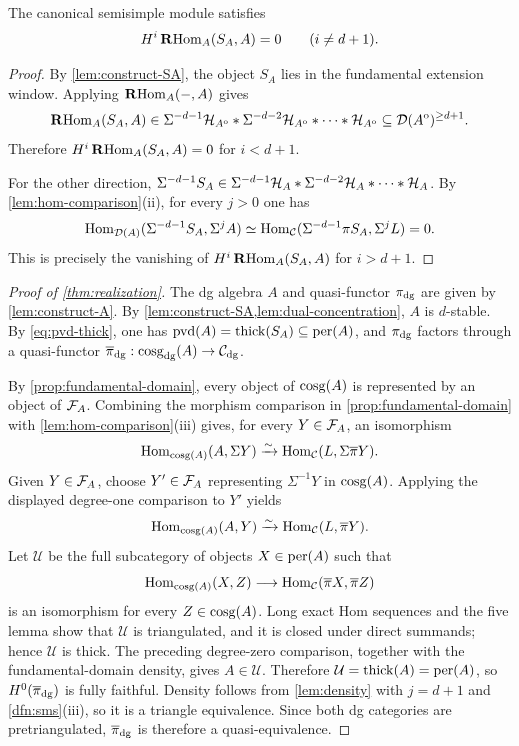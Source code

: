 \documentclass[11pt,a4paper,dvipsnames,x11names]{amsart}
\begin{document}
\begin{lem}\label{lem:dual-concentration}
    The canonical semisimple module satisfies
    \[
    H^i\operatorname{\mathbf{R}Hom}_A(S_A,A)=0\qquad(i\neq d+1).
    \]
\end{lem}
\begin{proof}
    By \cref{lem:construct-SA}, the object $S_A$ lies in the fundamental extension window. Applying $\operatorname{\mathbf{R}Hom}_A(-,A)$ gives
    \[
    \operatorname{\mathbf{R}Hom}_A(S_A,A)\in\Sigma^{-d-1}\mathcal H_{A^{\mathrm{o}}}*\Sigma^{-d-2}\mathcal H_{A^{\mathrm{o}}}*\cdots*\mathcal H_{A^{\mathrm{o}}}\subseteq\mathcal D(A^{\mathrm{o}})^{\geq d+1}.
    \]
    Therefore $H^i\operatorname{\mathbf{R}Hom}_A(S_A,A)=0$ for $i<d+1$.
    
    For the other direction, $\Sigma^{-d-1}S_A\in\Sigma^{-d-1}\mathcal H_A*\Sigma^{-d-2}\mathcal H_A*\cdots*\mathcal H_A$. By \cref{lem:hom-comparison}(ii), for every $j>0$ one has
    \[
    \operatorname{Hom}_{\mathcal D(A)}(\Sigma^{-d-1}S_A,\Sigma^jA)\simeq\operatorname{Hom}_{\mathcal C}(\Sigma^{-d-1}\pi S_A,\Sigma^jL)=0.
    \]
    This is precisely the vanishing of $H^i\operatorname{\mathbf{R}Hom}_A(S_A,A)$ for $i>d+1$.
\end{proof}
\begin{proof}[Proof of \cref{thm:realization}]
    The dg algebra $A$ and quasi-functor $\pi_{\mathrm{dg}}$ are given by \cref{lem:construct-A}. By \cref{lem:construct-SA,lem:dual-concentration}, $A$ is $d$-stable. By \eqref{eq:pvd-thick}, one has $\operatorname{pvd}(A)=\operatorname{thick}(S_A)\subseteq\operatorname{per}(A)$, and $\pi_{\mathrm{dg}}$ factors through a quasi-functor $\overline\pi_{\mathrm{dg}}:\operatorname{cosg}_{\mathrm{dg}}(A)\to\mathcal C_{\mathrm{dg}}$.
    
    By \cref{prop:fundamental-domain}, every object of $\operatorname{cosg}(A)$ is represented by an object of $\mathcal F_A$. Combining the morphism comparison in \cref{prop:fundamental-domain} with \cref{lem:hom-comparison}(iii) gives, for every $Y\in\mathcal F_A$, an isomorphism
    \[
    \operatorname{Hom}_{\operatorname{cosg}(A)}(A,\Sigma Y)\xrightarrow{\sim}\operatorname{Hom}_{\mathcal C}(L,\Sigma\overline\pi Y).
    \]
    Given $Y\in\mathcal F_A$, choose $Y'\in\mathcal F_A$ representing $\Sigma^{-1}Y$ in $\operatorname{cosg}(A)$. Applying the displayed degree-one comparison to $Y'$ yields
    \[
    \operatorname{Hom}_{\operatorname{cosg}(A)}(A,Y)\xrightarrow{\sim}\operatorname{Hom}_{\mathcal C}(L,\overline\pi Y).
    \]
    Let $\mathcal U$ be the full subcategory of objects $X\in\operatorname{per}(A)$ such that
    \[
    \operatorname{Hom}_{\operatorname{cosg}(A)}(X,Z)\longrightarrow\operatorname{Hom}_{\mathcal C}(\overline\pi X,\overline\pi Z)
    \]
    is an isomorphism for every $Z\in\operatorname{cosg}(A)$. Long exact Hom sequences and the five lemma show that $\mathcal U$ is triangulated, and it is closed under direct summands; hence $\mathcal U$ is thick. The preceding degree-zero comparison, together with the fundamental-domain density, gives $A\in\mathcal U$. Therefore $\mathcal U=\operatorname{thick}(A)=\operatorname{per}(A)$, so $H^0(\overline\pi_{\mathrm{dg}})$ is fully faithful. Density follows from \cref{lem:density} with $j=d+1$ and \cref{dfn:sms}(iii), so it is a triangle equivalence. Since both dg categories are pretriangulated, $\overline\pi_{\mathrm{dg}}$ is therefore a quasi-equivalence.
\end{proof}
\end{document}
